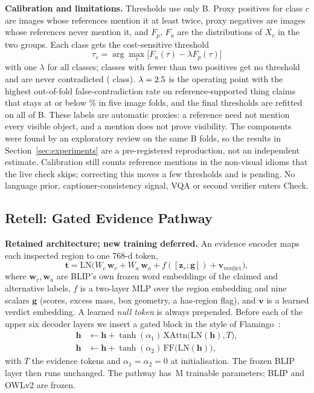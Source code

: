 \textbf{Calibration and limitations.} Thresholds use only B. Proxy positives for class $c$ are images whose references mention it at least twice, proxy negatives are images whose references never mention it, and $F_p$, $F_u$ are the distributions of $X_c$ in the two groups. Each class gets the cost-sensitive threshold
\begin{equation*}
\tau_c=\arg\max_{\tau}\big[F_u(\tau)-\lambda F_p(\tau)\big]
\end{equation*}
with one $\lambda$ for all classes; classes with fewer than two positives get no threshold and are never contradicted (\CSNoTau{} class). $\lambda=2.5$ is the operating point with the highest out-of-fold false-contradiction rate on reference-supported thing claims that stays at or below \CSTarget\% in five image folds, and the final thresholds are refitted on all of B. These labels are automatic proxies: a reference need not mention every visible object, and a mention does not prove visibility. The components were found by an exploratory review on the same B folds, so the results in Section~\ref{sec:experiments} are a pre-registered reproduction, not an independent estimate. Calibration still counts reference mentions in the non-visual idioms that the live check skips; correcting this moves a few thresholds and is pending. No language prior, captioner-consistency signal, VQA or second verifier enters Check.

\subsection{Retell: Gated Evidence Pathway}
\label{sec:design-retell}
\textbf{Retained architecture; new training deferred.} An evidence encoder maps each inspected region to one 768-d token,
\begin{equation*}
\mathbf{t}=\mathrm{LN}\big(W_c\,\mathbf{w}_c+W_a\,\mathbf{w}_a+f([\mathbf{z}_r;\mathbf{g}])+\mathbf{v}_{\text{verdict}}\big),
\end{equation*}
where $\mathbf{w}_c,\mathbf{w}_a$ are BLIP's own frozen word embeddings of the claimed and alternative labels, $f$ is a two-layer MLP over the region embedding and nine scalars $\mathbf{g}$ (scores, excess mass, box geometry, a has-region flag), and $\mathbf{v}$ is a learned verdict embedding. A learned \emph{null token} is always prepended. Before each of the upper six decoder layers we insert a gated block in the style of Flamingo~\cite{alayrac2022flamingo}:
\begin{align}
\mathbf{h}&\leftarrow\mathbf{h}+\tanh(\alpha_1)\,\mathrm{XAttn}\big(\mathrm{LN}(\mathbf{h}),T\big),\\
\mathbf{h}&\leftarrow\mathbf{h}+\tanh(\alpha_2)\,\mathrm{FF}\big(\mathrm{LN}(\mathbf{h})\big),
\end{align}
with $T$ the evidence tokens and $\alpha_1=\alpha_2=0$ at initialisation. The frozen BLIP layer then runs unchanged. The pathway has \ParamsM{}\,M trainable parameters; BLIP and OWLv2 are frozen.

